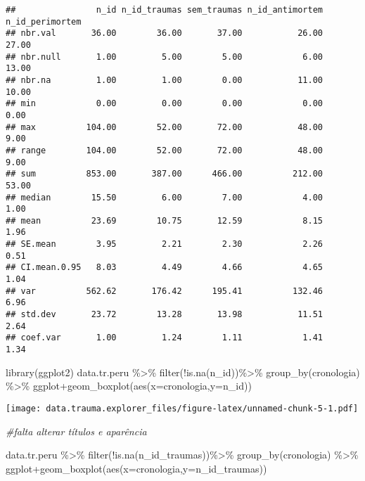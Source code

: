 \documentclass[
]{article}
\newenvironment{Shaded}{\begin{snugshade}}{\end{snugshade}}
\newcommand{\AttributeTok}[1]{\textcolor[rgb]{0.77,0.63,0.00}{#1}}
\newcommand{\CommentTok}[1]{\textcolor[rgb]{0.56,0.35,0.01}{\textit{#1}}}
\newcommand{\FunctionTok}[1]{\textcolor[rgb]{0.00,0.00,0.00}{#1}}
\newcommand{\NormalTok}[1]{#1}
\newcommand{\SpecialCharTok}[1]{\textcolor[rgb]{0.00,0.00,0.00}{#1}}
\begin{document}
\begin{verbatim}
##                n_id n_id_traumas sem_traumas n_id_antimortem n_id_perimortem
## nbr.val       36.00        36.00       37.00           26.00           27.00
## nbr.null       1.00         5.00        5.00            6.00           13.00
## nbr.na         1.00         1.00        0.00           11.00           10.00
## min            0.00         0.00        0.00            0.00            0.00
## max          104.00        52.00       72.00           48.00            9.00
## range        104.00        52.00       72.00           48.00            9.00
## sum          853.00       387.00      466.00          212.00           53.00
## median        15.50         6.00        7.00            4.00            1.00
## mean          23.69        10.75       12.59            8.15            1.96
## SE.mean        3.95         2.21        2.30            2.26            0.51
## CI.mean.0.95   8.03         4.49        4.66            4.65            1.04
## var          562.62       176.42      195.41          132.46            6.96
## std.dev       23.72        13.28       13.98           11.51            2.64
## coef.var       1.00         1.24        1.11            1.41            1.34
\end{verbatim}

\begin{Shaded}
\begin{Highlighting}[]
\FunctionTok{library}\NormalTok{(ggplot2)}
\NormalTok{data.tr.peru }\SpecialCharTok{\%\textgreater{}\%} \FunctionTok{filter}\NormalTok{(}\SpecialCharTok{!}\FunctionTok{is.na}\NormalTok{(n\_id))}\SpecialCharTok{\%\textgreater{}\%}
                \FunctionTok{group\_by}\NormalTok{(cronologia) }\SpecialCharTok{\%\textgreater{}\%}\NormalTok{ ggplot}\SpecialCharTok{+}\FunctionTok{geom\_boxplot}\NormalTok{(}\FunctionTok{aes}\NormalTok{(}\AttributeTok{x=}\NormalTok{cronologia,}\AttributeTok{y=}\NormalTok{n\_id))}
\end{Highlighting}
\end{Shaded}

\texttt{[image: data.trauma.explorer\_files/figure-latex/unnamed-chunk-5-1.pdf]}

\begin{Shaded}
\begin{Highlighting}[]
\CommentTok{\#falta alterar títulos e aparência }
\end{Highlighting}
\end{Shaded}

\begin{Shaded}
\begin{Highlighting}[]
\NormalTok{data.tr.peru }\SpecialCharTok{\%\textgreater{}\%} \FunctionTok{filter}\NormalTok{(}\SpecialCharTok{!}\FunctionTok{is.na}\NormalTok{(n\_id\_traumas))}\SpecialCharTok{\%\textgreater{}\%}
                \FunctionTok{group\_by}\NormalTok{(cronologia) }\SpecialCharTok{\%\textgreater{}\%}\NormalTok{ ggplot}\SpecialCharTok{+}\FunctionTok{geom\_boxplot}\NormalTok{(}\FunctionTok{aes}\NormalTok{(}\AttributeTok{x=}\NormalTok{cronologia,}\AttributeTok{y=}\NormalTok{n\_id\_traumas))}
\end{Highlighting}
\end{Shaded}
\end{document}

